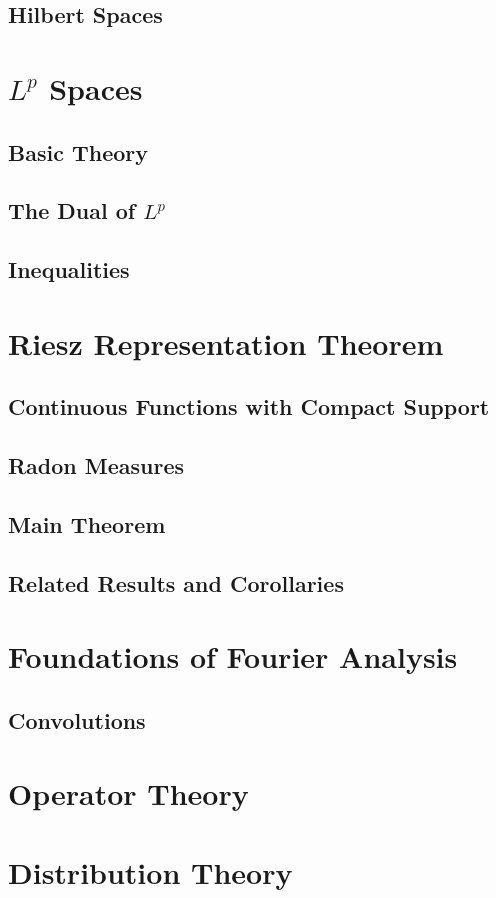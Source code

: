 \documentclass{article}
\theoremstyle{definition}
\begin{document}
	\subsection{Hilbert Spaces}
	\section{$ L^p $ Spaces}
	\subsection{Basic Theory}
	\subsection{The Dual of $ L^p $}
	\subsection{Inequalities}
	\section{Riesz Representation Theorem}
	\subsection{Continuous Functions with Compact Support}
	\subsection{Radon Measures}
	\subsection{Main Theorem}
	\subsection{Related Results and Corollaries}
	\section{Foundations of Fourier Analysis}
	\subsection{Convolutions}
	\section{Operator Theory}
	\section{Distribution Theory}
\end{document}
